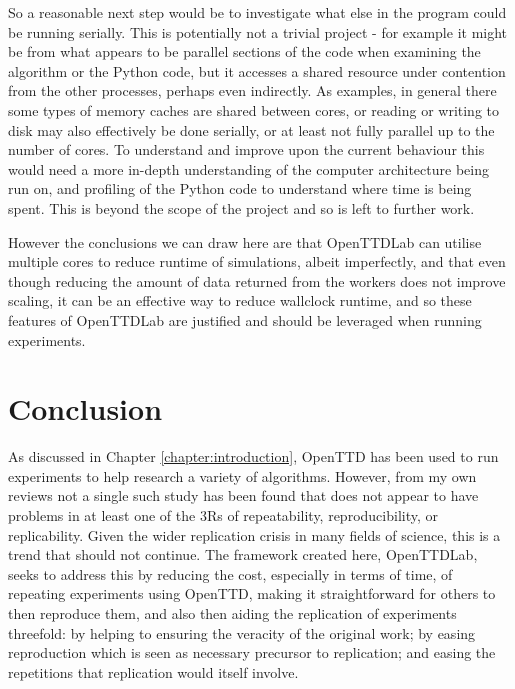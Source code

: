 \documentclass[logo,msc,dsti]{infthesis}    %
\begin{document}
{So a reasonable next step would be to investigate what else in the program could be running serially. This is potentially not a trivial project - for example it might be from what appears to be parallel sections of the code when examining the algorithm or the Python code, but it accesses a shared resource under contention from the other processes, perhaps even indirectly. As examples, in general there some types of memory caches are shared between cores, or reading or writing to disk  may also effectively be done serially, or at least not fully parallel up to the number of cores. To understand and improve upon the current behaviour this would need a more in-depth understanding of the computer architecture being run on, and profiling of the Python code to understand where time is being spent. This is beyond the scope of the project and so is left to further work.

However the conclusions we can draw here are that OpenTTDLab can utilise multiple cores to reduce runtime of simulations, albeit imperfectly, and that even though reducing the amount of data returned from the workers does not improve scaling, it can be an effective way to reduce wallclock runtime, and so these features of OpenTTDLab are justified and should be leveraged when running experiments.


\chapter{Conclusion}
\label{chapter:conclusion}

As discussed in Chapter \ref{chapter:introduction}, OpenTTD has been used to run experiments to help research a variety of algorithms. However, from my own reviews not a single such study has been found that does not appear to have problems in at least one of the 3Rs of repeatability, reproducibility, or replicability. Given the wider replication crisis in many fields of science, this is a trend that should not continue. The framework created here, OpenTTDLab, seeks to address this by reducing the cost, especially in terms of time, of repeating experiments using OpenTTD, making it straightforward for others to then reproduce them, and also then aiding the replication of experiments threefold: by helping to ensuring the veracity of the original work; by easing reproduction which is seen as necessary precursor to replication; and easing the repetitions that replication would itself involve.

}
\end{document}
